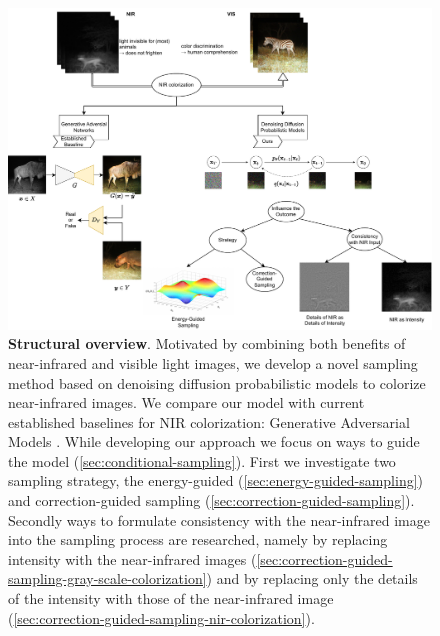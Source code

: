 \begin{figure}[p]
    \includegraphics[width=\textwidth]{gfx/Graphical-Abstract.pdf}
    \caption{
        \textbf{Structural overview}.
        Motivated by combining both benefits of near-infrared and visible light images, 
        we develop a novel sampling method based on denoising diffusion probabilistic models \parencite{ddpm} to colorize near-infrared images. 
        We compare our model with current established baselines for NIR colorization: Generative Adversarial Models \parencite{mehri}. 
        While developing our approach we focus on ways to guide the model (\autoref{sec:conditional-sampling}). 
        First we investigate two sampling strategy, the energy-guided (\autoref{sec:energy-guided-sampling}) and correction-guided sampling (\autoref{sec:correction-guided-sampling}). 
        Secondly ways to formulate consistency with the near-infrared image into the sampling process are researched, namely by replacing intensity with the near-infrared images (\autoref{sec:correction-guided-sampling-gray-scale-colorization}) 
        and by replacing only the details of the intensity with those of the near-infrared image (\autoref{sec:correction-guided-sampling-nir-colorization}).
    }
\end{figure}
